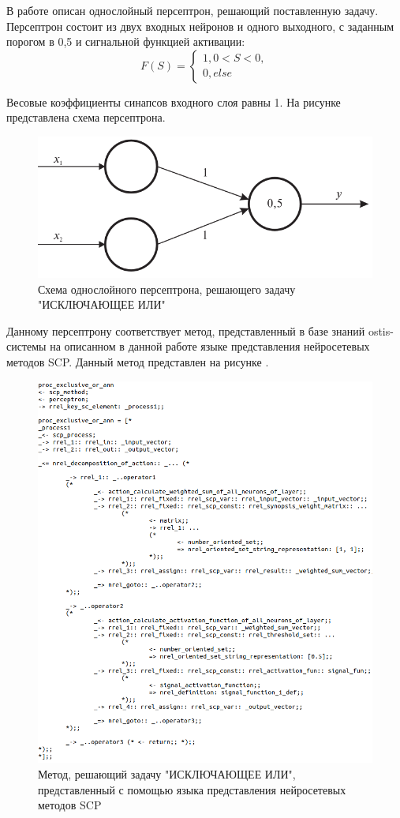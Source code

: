 В работе  описан однослойный персептрон, решающий поставленную задачу. Персептрон состоит из двух входных нейронов и одного выходного, с заданным порогом в 0,5 и сигнальной функцией активации:
\begin{equation*}
	F(S) =
	\begin{cases}
		1, 0 < S < 0,\\
		0, else
	\end{cases}
\end{equation*}

Весовые коэффициенты синапсов входного слоя равны 1. На рисунке \textit{} представлена схема персептрона.

\begin{figure}
	\centering
	\includegraphics[width=0.5\linewidth]{author/part3/figures/strong_or_ann.png}
	\caption{Схема однослойного персептрона, решающего задачу "ИСКЛЮЧАЮЩЕЕ ИЛИ"{}}
	\label{fig:strong_or_ann}
\end{figure}

Данному персептрону соответствует метод, представленный в базе знаний ostis-системы на описанном в данной работе языке представления нейросетевых методов SCP. Данный метод представлен на рисунке \textit{}.

\begin{figure}
	\centering
	\includegraphics[width=0.95\linewidth]{author/part3/figures/exclusive_or_ann_scp.png}
	\caption{Метод, решающий задачу "ИСКЛЮЧАЮЩЕЕ ИЛИ"{}, представленный с помощью языка представления нейросетевых методов SCP}
	\label{fig:exclusive_or_ann_scp}
\end{figure}

